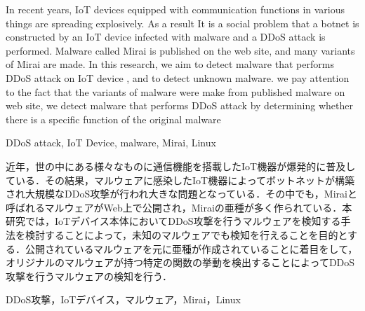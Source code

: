 \maketitle    %
\begin{eabstract}
{In recent years, IoT devices equipped with communication functions in various things are spreading explosively. As a result It is a social problem that a botnet is constructed by an IoT device infected with malware and a DDoS attack is performed. Malware called Mirai is published on the web site, and many variants of Mirai are made. In this research, we aim to detect malware that performs DDoS attack on IoT device , and to detect unknown malware. we pay attention to the fact that the variants of malware were make from published malware on web site, we detect malware that performs DDoS attack by determining whether there is a specific function of the original malware}
\end{eabstract}

\begin{ekeyword}
DDoS attack, IoT Device, malware, Mirai, Linux
\end{ekeyword}

\begin{jabstract}
近年，世の中にある様々なものに通信機能を搭載したIoT機器が爆発的に普及している．その結果，マルウェアに感染したIoT機器によってボットネットが構築され大規模なDDoS攻撃が行われ大きな問題となっている．その中でも，Miraiと呼ばれるマルウェアがWeb上で公開され，Miraiの亜種が多く作られている．本研究では，IoTデバイス本体においてDDoS攻撃を行うマルウェアを検知する手法を検討することによって，未知のマルウェアでも検知を行えることを目的とする．公開されているマルウェアを元に亜種が作成されていることに着目をして，オリジナルのマルウェアが持つ特定の関数の挙動を検出することによってDDoS攻撃を行うマルウェアの検知を行う．
\end{jabstract}

\begin{jkeyword}
DDoS攻撃，IoTデバイス，マルウェア，Mirai，Linux
\end{jkeyword}
\tableofcontents %
